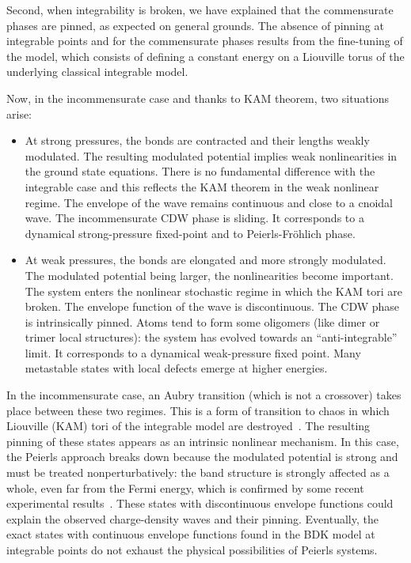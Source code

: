 \documentclass[]{revtex4-1}
\begin{document}
Second, when integrability is broken, we have explained that the commensurate phases are pinned, as expected on general grounds. The absence of pinning at integrable points and for the commensurate phases results from the fine-tuning of the model, which consists of defining a constant energy on a Liouville torus of the underlying classical integrable model. 

Now, in the incommensurate case and thanks to KAM theorem, two situations arise:

\begin{itemize} \item At strong pressures, the bonds are contracted and their lengths weakly modulated. The resulting modulated potential implies weak nonlinearities in the ground state equations. There is no fundamental difference with the integrable case  and this reflects the KAM theorem in the weak nonlinear regime.
 The envelope of the wave remains continuous and close to a cnoidal wave. The incommensurate CDW phase is sliding.  It corresponds to a dynamical strong-pressure fixed-point and to Peierls-Fr\"ohlich phase.
\item At weak pressures, the bonds are elongated and more strongly modulated. The modulated potential being larger, the nonlinearities become important. The system enters the nonlinear stochastic regime in which the KAM tori are broken. 
  The envelope function of the wave is discontinuous.  The CDW phase is intrinsically pinned. Atoms tend to form some oligomers (like dimer or trimer local structures):  the system has evolved towards an ``anti-integrable'' limit. It corresponds to a dynamical weak-pressure fixed point. Many metastable states with local defects emerge at higher energies.  \end{itemize}

In the incommensurate case, an Aubry transition (which is not a crossover) takes place between these two regimes. This is a form of transition to chaos in which Liouville (KAM) tori of the integrable model are destroyed~\cite{aubry0}. The resulting pinning of these states appears as an intrinsic nonlinear mechanism.
In this case, the Peierls approach breaks down because the modulated potential is strong and must be treated nonperturbatively: 
the band structure is strongly affected as a whole, even far from the Fermi energy, which is confirmed by some recent experimental results~\cite{rossnagel}. These states with discontinuous envelope functions could explain the observed charge-density waves and their pinning. Eventually, the exact states with continuous envelope functions found in the BDK model at integrable points do not exhaust the physical possibilities of Peierls systems.
\end{document}
